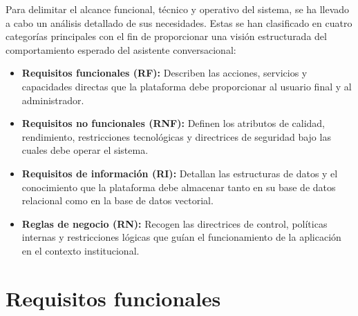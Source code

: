 \documentclass[12pt,a4paper,oneside]{report}
\begin{document}
Para delimitar el alcance funcional, técnico y operativo del sistema, se ha llevado a cabo un análisis detallado de sus necesidades. Estas se han clasificado en cuatro categorías principales con el fin de proporcionar una visión estructurada del comportamiento esperado del asistente conversacional:
\begin{itemize}
    \item \textbf{Requisitos funcionales (RF):} Describen las acciones, servicios y capacidades directas que la plataforma debe proporcionar al usuario final y al administrador.
    \item \textbf{Requisitos no funcionales (RNF):} Definen los atributos de calidad, rendimiento, restricciones tecnológicas y directrices de seguridad bajo las cuales debe operar el sistema.
    \item \textbf{Requisitos de información (RI):} Detallan las estructuras de datos y el conocimiento que la plataforma debe almacenar tanto en su base de datos relacional como en la base de datos vectorial.
    \item \textbf{Reglas de negocio (RN):} Recogen las directrices de control, políticas internas y restricciones lógicas que guían el funcionamiento de la aplicación en el contexto institucional.
\end{itemize}

\section{Requisitos funcionales}
\end{document}
